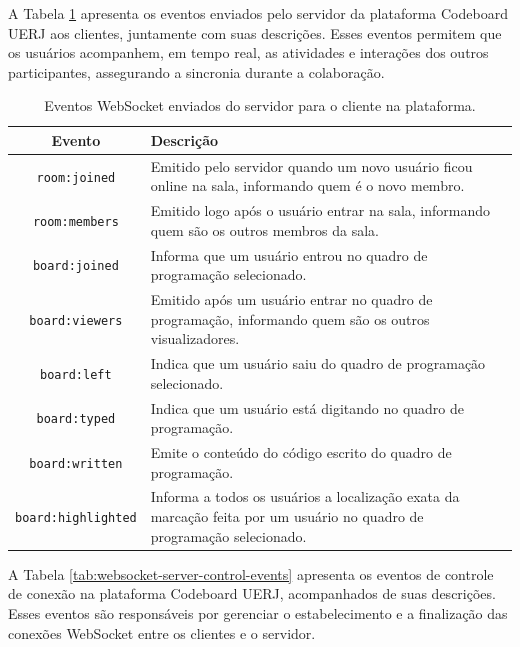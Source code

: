 A Tabela \ref{tab:websocket-server-to-client-events} apresenta os eventos enviados pelo servidor da plataforma Codeboard UERJ aos clientes, juntamente com suas descrições. Esses eventos permitem que os usuários acompanhem, em tempo real, as atividades e interações dos outros participantes, assegurando a sincronia durante a colaboração.

\begin{table}[H]
    \centering
    \caption{Eventos WebSocket enviados do servidor para o cliente na plataforma.}
    \label{tab:websocket-server-to-client-events}
    \renewcommand{\arraystretch}{1.3} 
    \begin{tabular}{|c|p{10cm}|}
        \hline
        \textbf{Evento} & \textbf{Descrição} \\
        \hline
        \texttt{room:joined} & Emitido pelo servidor quando um novo usuário ficou online na sala, informando quem é o novo membro. \\
        \hline
        \texttt{room:members} & Emitido logo após o usuário entrar na sala, informando quem são os outros membros da sala. \\
        \hline
        \texttt{board:joined} & Informa que um usuário entrou no quadro de programação selecionado. \\
        \hline
        \texttt{board:viewers} & Emitido após um usuário entrar no quadro de programação, informando quem são os outros visualizadores. \\
        \hline
        \texttt{board:left} & Indica que um usuário saiu do quadro de programação selecionado. \\
        \hline
        \texttt{board:typed} & Indica que um usuário está digitando no quadro de programação. \\
        \hline
        \texttt{board:written} & Emite o conteúdo do código escrito do quadro de programação. \\
        \hline
        \texttt{board:highlighted} & Informa a todos os usuários a localização exata da marcação feita por um usuário no quadro de programação selecionado. \\
        \hline
    \end{tabular}
\end{table}

A Tabela \ref{tab:websocket-server-control-events} apresenta os eventos de controle de conexão na plataforma Codeboard UERJ, acompanhados de suas descrições. Esses eventos são responsáveis por gerenciar o estabelecimento e a finalização das conexões WebSocket entre os clientes e o servidor.

